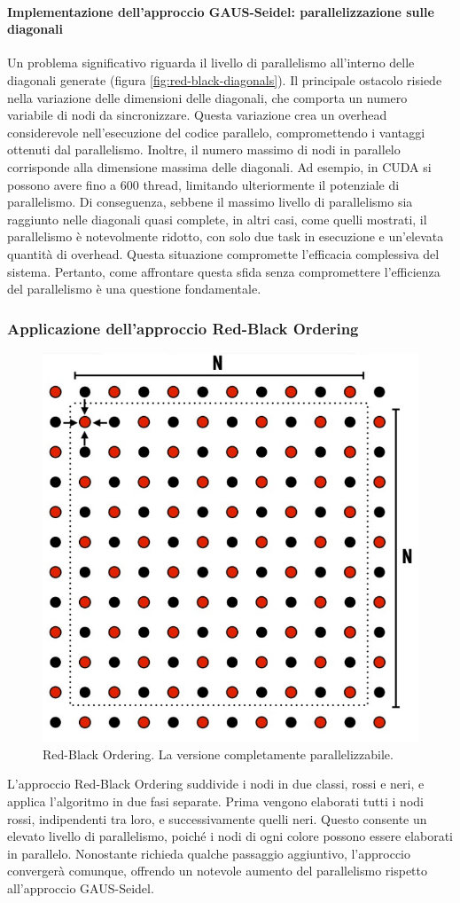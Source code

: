\paragraph{Implementazione dell'approccio GAUS-Seidel: parallelizzazione sulle diagonali}

Un problema significativo riguarda il livello di parallelismo all'interno delle diagonali generate (figura \ref{fig:red-black-diagonals}). Il principale ostacolo risiede nella variazione delle dimensioni delle diagonali, che comporta un numero variabile di nodi da sincronizzare. Questa variazione crea un overhead considerevole nell'esecuzione del codice parallelo, compromettendo i vantaggi ottenuti dal parallelismo. Inoltre, il numero massimo di nodi in parallelo corrisponde alla dimensione massima delle diagonali. Ad esempio, in CUDA si possono avere fino a 600 thread, limitando ulteriormente il potenziale di parallelismo. Di conseguenza, sebbene il massimo livello di parallelismo sia raggiunto nelle diagonali quasi complete, in altri casi, come quelli mostrati, il parallelismo è notevolmente ridotto, con solo due task in esecuzione e un'elevata quantità di overhead. Questa situazione compromette l'efficacia complessiva del sistema. Pertanto, come affrontare questa sfida senza compromettere l'efficienza del parallelismo è una questione fondamentale.

\subsubsection{Applicazione dell'approccio Red-Black Ordering}
\begin{figure}[th]
	\centering
	\includegraphics[width=0.5\linewidth]{img/red-black-ordering}
	\caption{Red-Black Ordering. La versione completamente parallelizzabile.}
	\label{fig:red-black-ordering}
\end{figure}
L'approccio Red-Black Ordering suddivide i nodi in due classi, rossi e neri, e applica l'algoritmo in due fasi separate. Prima vengono elaborati tutti i nodi rossi, indipendenti tra loro, e successivamente quelli neri. Questo consente un elevato livello di parallelismo, poiché i nodi di ogni colore possono essere elaborati in parallelo. Nonostante richieda qualche passaggio aggiuntivo, l'approccio convergerà comunque, offrendo un notevole aumento del parallelismo rispetto all'approccio GAUS-Seidel. 

